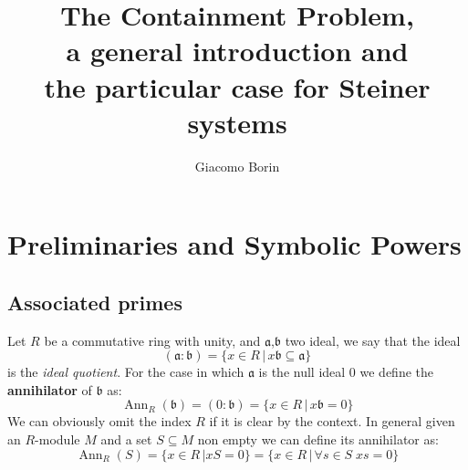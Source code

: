 \documentclass[notitlepage, a4]{book}
\title{The Containment Problem, 
\\a general introduction and 
\\the particular case for Steiner systems}
\author{Giacomo Borin}
\theoremstyle{plain}
\theoremstyle{remark}
\theoremstyle{definition}
\newcommand{\A}{\mathfrak{a}}
\newcommand{\B}{\mathfrak{b}}
\DeclareMathOperator{\Ann}{Ann}
\begin{document}
\frontmatter

\pagestyle{fancy}
\fancyhf{}

\renewcommand{\headrulewidth}{1.5pt}
\renewcommand{\footrulewidth}{1.5pt}



\renewcommand{\headrulewidth}{1pt}
\renewcommand{\footrulewidth}{0pt}
\renewcommand{\chaptermark}[1]{\markboth{#1}{}}
\rhead{\leftmark}
\rfoot{\thepage}

\tableofcontents

%
%

\mainmatter



\chapter{Preliminaries and Symbolic Powers}


\section{Associated primes}

Let $ R $ be a commutative ring with unity, and $ \A $,$ \B $ two ideal, we say that the ideal
\begin{equation*}
	(\A : \B) = \{ x \in R \,|\, x\B \subseteq \A  \}
\end{equation*}
 \nocite{AMCD}
is the \textit{ideal quotient}. For the case in which $ \A $  is the null ideal $ 0 $ we define the \textbf{annihilator} of $ \B $ as:
\begin{equation*}
	\Ann_R(\B) = (0 : \B) = \{ x \in R \,|\, x\B = 0  \}
\end{equation*}
We can obviously omit the index $ R $ if it is clear by the context. In general given an $ R  $-module $ M $ and a set $ S \subseteq M $ non empty we can define its annihilator as:
\begin{equation*}
	\Ann_R (S) = \{ x \in R \,| xS = 0  \} = \{ x \in R \,|\, \forall s \in S \; xs = 0  \}
\end{equation*}
\end{document}
